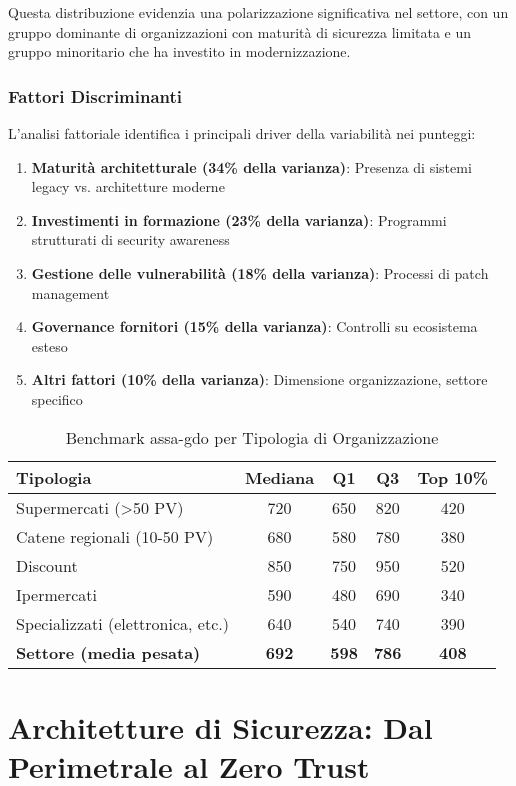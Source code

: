 Questa distribuzione evidenzia una polarizzazione significativa nel settore, con un gruppo dominante di organizzazioni con maturità di sicurezza limitata e un gruppo minoritario che ha investito in modernizzazione.

\subsubsection{Fattori Discriminanti}

L'analisi fattoriale identifica i principali driver della variabilità nei punteggi:

\begin{enumerate}
\item \textbf{Maturità architetturale (34\% della varianza)}: Presenza di sistemi legacy vs. architetture moderne
\item \textbf{Investimenti in formazione (23\% della varianza)}: Programmi strutturati di security awareness
\item \textbf{Gestione delle vulnerabilità (18\% della varianza)}: Processi di patch management
\item \textbf{Governance fornitori (15\% della varianza)}: Controlli su ecosistema esteso
\item \textbf{Altri fattori (10\% della varianza)}: Dimensione organizzazione, settore specifico
\end{enumerate}

\begin{table}[htbp]
\centering
\caption{Benchmark \gls{assa-gdo} per Tipologia di Organizzazione}
\label{tab:assa_benchmark}
\begin{tabular}{lcccc}
\toprule
\textbf{Tipologia} & \textbf{Mediana} & \textbf{Q1} & \textbf{Q3} & \textbf{Top 10\%} \\
\midrule
Supermercati (>50 PV) & 720 & 650 & 820 & 420 \\
Catene regionali (10-50 PV) & 680 & 580 & 780 & 380 \\
Discount & 850 & 750 & 950 & 520 \\
Ipermercati & 590 & 480 & 690 & 340 \\
Specializzati (elettronica, etc.) & 640 & 540 & 740 & 390 \\
\midrule
\textbf{Settore (media pesata)} & \textbf{692} & \textbf{598} & \textbf{786} & \textbf{408} \\
\bottomrule
\end{tabular}
\end{table}

\section{\texorpdfstring{Architetture di Sicurezza: Dal Perimetrale al Zero Trust}{2.4 - Architetture di Sicurezza: Dal Perimetrale al Zero Trust}}
\label{sec:2.4_architetture_sicurezza}


